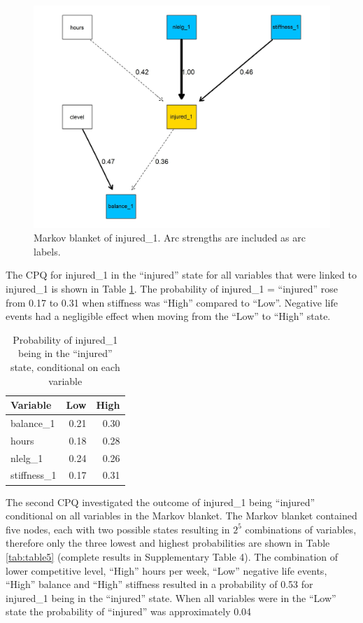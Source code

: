 \documentclass[
  english,
  man]{apa6}
\begin{document}
\begin{figure}

{\centering \includegraphics[width=1\linewidth]{figures_doc/Fig2} 

}

\caption{Markov blanket of injured\_1. Arc strengths are included as arc labels.}\label{fig:fig2}
\end{figure}

The CPQ for injured\_1 in the ``injured'' state for all variables that were linked to injured\_1 is shown in Table \ref{tab:table4}.
The probability of injured\_1 = ``injured'' rose from 0.17 to 0.31 when stiffness was ``High'' compared to ``Low''.
Negative life events had a negligible effect when moving from the ``Low'' to ``High'' state.

\begin{table}[H]

\caption{\label{tab:table4}Probability of injured\_1 being in the ``injured'' state, conditional on each variable}
\centering
\begin{tabular}[t]{l|r|r}
\hline
\textbf{Variable} & \textbf{Low} & \textbf{High}\\
\hline
balance\_1 & 0.21 & 0.30\\
\hline
hours & 0.18 & 0.28\\
\hline
nlelg\_1 & 0.24 & 0.26\\
\hline
stiffness\_1 & 0.17 & 0.31\\
\hline
\end{tabular}
\end{table}

The second CPQ investigated the outcome of injured\_1 being ``injured'' conditional on all variables in the Markov blanket.
The Markov blanket contained five nodes, each with two possible states resulting in \(2^5\) combinations of variables, therefore only the three lowest and highest probabilities are shown in Table \ref{tab:table5} (complete results in Supplementary Table 4).
The combination of lower competitive level, ``High'' hours per week, ``Low'' negative life events, ``High'' balance and ``High'' stiffness resulted in a probability of 0.53 for injured\_1 being in the ``injured'' state.
When all variables were in the ``Low'' state the probability of ``injured'' was approximately 0.04
\end{document}
